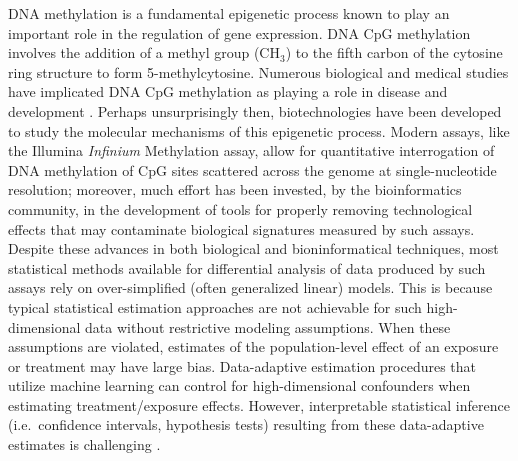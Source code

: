 \documentclass[9pt,a4paper,]{extarticle}
\theoremstyle{definition}
\theoremstyle{definition}
\theoremstyle{definition}
\theoremstyle{remark}
\begin{document}
DNA methylation is a fundamental epigenetic process known to play an important
role in the regulation of gene expression. DNA CpG methylation involves the
addition of a methyl group (\(\text{CH}_3\)) to the fifth carbon of the cytosine
ring structure to form 5-methylcytosine. Numerous biological and medical studies
have implicated DNA CpG methylation as playing a role in disease and
development \citep{robertson2005dna}. Perhaps unsurprisingly then, biotechnologies
have been developed to study the molecular mechanisms of this epigenetic
process. Modern assays, like the Illumina \emph{Infinium} Methylation assay,
allow for quantitative interrogation of DNA methylation of CpG sites scattered
across the genome at single-nucleotide resolution; moreover, much effort
has been invested, by the bioinformatics community, in the development of tools
for properly removing technological effects that may contaminate biological
signatures measured by such assays. Despite these advances in both biological
and bioninformatical techniques, most statistical methods available for
differential analysis of data produced by such assays rely on over-simplified
(often generalized linear) models. This is because typical statistical
estimation approaches are not achievable for such high-dimensional data without
restrictive modeling assumptions. When these assumptions are violated, estimates
of the population-level effect of an exposure or treatment may have large bias.
Data-adaptive estimation procedures that utilize machine learning can control
for high-dimensional confounders when estimating treatment/exposure effects.
However, interpretable statistical inference (i.e.~confidence intervals,
hypothesis tests) resulting from these data-adaptive estimates is challenging
\citep{libbrecht2015machine}.
\end{document}
